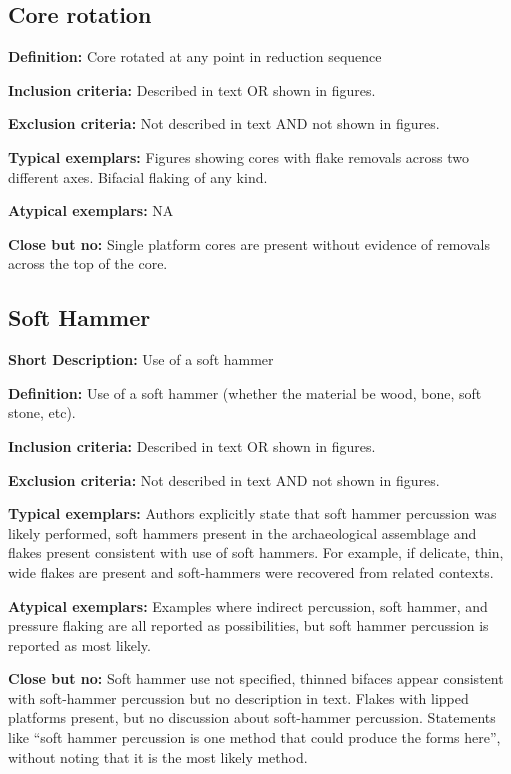 \documentclass[
]{article}
\begin{document}
\subsection{Core rotation}\label{core-rotation}

\textbf{Definition:} Core rotated at any point in reduction sequence

\textbf{Inclusion criteria:} Described in text OR shown in figures.

\textbf{Exclusion criteria:} Not described in text AND not shown in
figures.

\textbf{Typical exemplars:} Figures showing cores with flake removals
across two different axes. Bifacial flaking of any kind.

\textbf{Atypical exemplars:} NA

\textbf{Close but no:} Single platform cores are present without
evidence of removals across the top of the core.

\subsection{Soft Hammer}\label{soft-hammer}

\textbf{Short Description:} Use of a soft hammer

\textbf{Definition:} Use of a soft hammer (whether the material be wood,
bone, soft stone, etc).

\textbf{Inclusion criteria:} Described in text OR shown in figures.

\textbf{Exclusion criteria:} Not described in text AND not shown in
figures.

\textbf{Typical exemplars:} Authors explicitly state that soft hammer
percussion was likely performed, soft hammers present in the
archaeological assemblage and flakes present consistent with use of soft
hammers. For example, if delicate, thin, wide flakes are present and
soft-hammers were recovered from related contexts.

\textbf{Atypical exemplars:} Examples where indirect percussion, soft
hammer, and pressure flaking are all reported as possibilities, but soft
hammer percussion is reported as most likely.

\textbf{Close but no:} Soft hammer use not specified, thinned bifaces
appear consistent with soft-hammer percussion but no description in
text. Flakes with lipped platforms present, but no discussion about
soft-hammer percussion. Statements like ``soft hammer percussion is one
method that could produce the forms here'', without noting that it is
the most likely method.
\end{document}

